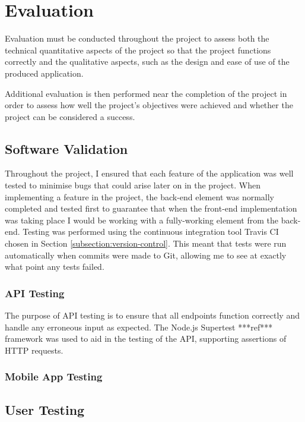 \chapter{Evaluation}

Evaluation must be conducted throughout the project to assess both the technical quantitative aspects of the project so that the project functions correctly and the qualitative aspects, such as the design and ease of use of the produced application.

Additional evaluation is then performed near the completion of the project in order to assess how well the project's objectives were achieved and whether the project can be considered a success.

\section{Software Validation}

Throughout the project, I ensured that each feature of the application was well tested to minimise bugs that could arise later on in the project. When implementing a feature in the project, the back-end element was normally completed and tested first to guarantee that when the front-end implementation was taking place I would be working with a fully-working element from the back-end. Testing was performed using the continuous integration tool Travis CI chosen in Section \ref{subsection:version-control}. This meant that tests were run automatically when commits were made to Git, allowing me to see at exactly what point any tests failed.

\subsection{API Testing}

The purpose of API testing is to ensure that all endpoints function correctly and handle any erroneous input as expected. The Node.js Supertest ***ref*** framework was used to aid in the testing of the API, supporting assertions of HTTP requests. 

\subsection{Mobile App Testing}

\section{User Testing}

